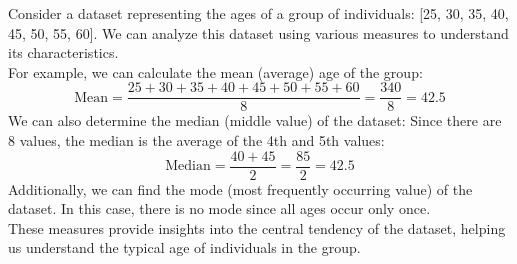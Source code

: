 \documentclass[openany]{book}
\begin{document}
\begin{example}
    Consider a dataset representing the ages of a group of individuals: [25, 30, 35, 40, 45, 50, 55, 60]. We can analyze this dataset using various measures to understand its characteristics. \\
    For example, we can calculate the mean (average) age of the group:
    $$\text{Mean} = \frac{25 + 30 + 35 + 40 + 45 + 50 + 55 + 60}{8} = \frac{340}{8} = 42.5$$
    We can also determine the median (middle value) of the dataset:
    Since there are 8 values, the median is the average of the 4th and 5th values:
    $$\text{Median} = \frac{40 + 45}{2} = \frac{85}{2} = 42.5$$
    Additionally, we can find the mode (most frequently occurring value) of the dataset. In this case, there is no mode since all ages occur only once. \\
    These measures provide insights into the central tendency of the dataset, helping us understand the typical age of individuals in the group.
\end{example}
\end{document}
